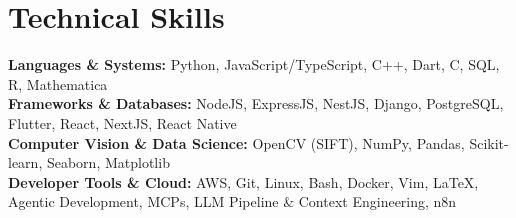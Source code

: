\medskip

\resumeItemListStart
{}
\resumeItemListEnd
\resumeItemListEnd

\resumeSubHeadingListEnd

\section{Technical Skills}
\begin{itemize}[leftmargin=0.15in, label={}]
  \small{\item{
        \textbf{Languages \& Systems:} {Python, JavaScript/TypeScript, C++, Dart, C, SQL, R, Mathematica} \\
        \textbf{Frameworks \& Databases:} {NodeJS, ExpressJS, NestJS, Django, PostgreSQL, Flutter, React, NextJS, React Native} \\
        \textbf{Computer Vision \& Data Science:} {OpenCV (SIFT), NumPy, Pandas, Scikit-learn, Seaborn, Matplotlib} \\
        \textbf{Developer Tools \& Cloud:} {AWS, Git, Linux, Bash, Docker, Vim, \LaTeX\EndAccSupp{}, Agentic Development, MCPs, LLM Pipeline \& Context Engineering, n8n} \\
        }}
\end{itemize}